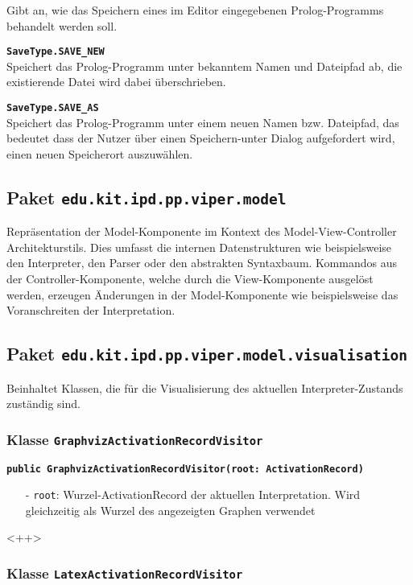 \documentclass[parskip=full,11pt,twoside]{scrartcl}
\begin{document}
Gibt an, wie das Speichern eines im Editor eingegebenen Prolog-Programms behandelt werden soll.

\textbf{\texttt{SaveType.SAVE\_NEW}}\\
Speichert das Prolog-Programm unter bekanntem Namen und Dateipfad ab, die existierende Datei wird dabei überschrieben.

\textbf{\texttt{SaveType.SAVE\_AS}}\\
Speichert das Prolog-Programm unter einem neuen Namen bzw. Dateipfad, das bedeutet dass der Nutzer über einen Speichern-unter Dialog aufgefordert wird, einen neuen Speicherort auszuwählen.

\subsection{Paket \texttt{edu.kit.ipd.pp.viper.model}}

Repräsentation der Model-Komponente im Kontext des Model-View-Controller Architekturstils. Dies umfasst die internen Datenstrukturen wie beispielsweise den Interpreter, den Parser oder den abstrakten Syntaxbaum. Kommandos aus der Controller-Komponente, welche durch die View-Komponente ausgelöst werden, erzeugen Änderungen in der Model-Komponente wie beispielsweise das Voranschreiten der Interpretation.

\subsection{Paket \texttt{edu.kit.ipd.pp.viper.model.visualisation}}

Beinhaltet Klassen, die für die Visualisierung des aktuellen Interpreter-Zustands zuständig sind.

\subsubsection{Klasse \texttt{GraphvizActivationRecordVisitor}}

\textbf{\texttt{public GraphvizActivationRecordVisitor(root: ActivationRecord)}}\\
\begin{itemize}[noitemsep]
	\item[-] \texttt{root}: Wurzel-ActivationRecord der aktuellen Interpretation. Wird gleichzeitig als Wurzel des angezeigten Graphen verwendet
\end{itemize}
<++>

\subsubsection{Klasse \texttt{LatexActivationRecordVisitor}}
\end{document}
